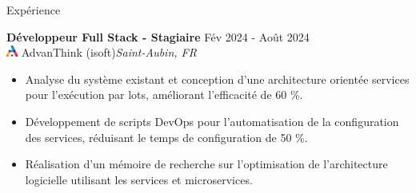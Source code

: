 \documentclass{resume}
\begin{document}
\begin{rSection}{Expérience}

\textbf{Développeur Full Stack - Stagiaire} \hfill Fév 2024 - Août 2024\\
\href{https://www.advanthink.com}{\includegraphics[height=1em]{../Ressource/Logo Symbol A en couleur.png}} AdvanThink (isoft)\hfill \textit{Saint-Aubin, FR}
 \begin{itemize}
    \itemsep -3pt {} 
    \item Analyse du système existant et conception d'une architecture orientée services pour l'exécution par lots, améliorant l'efficacité de 60 \%.
    \item Développement de scripts DevOps pour l'automatisation de la configuration des services, réduisant le temps de configuration de 50 \%.
    \item Réalisation d'un mémoire de recherche sur l'optimisation de l'architecture logicielle utilisant les services et microservices.
 \end{itemize}
\end{rSection} 
\end{document}
